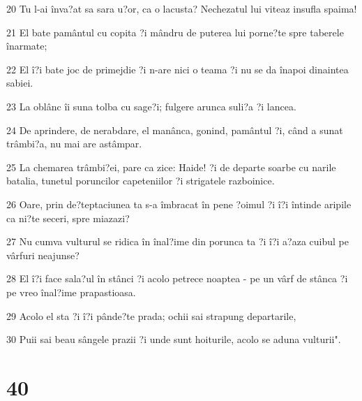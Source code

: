 \par 20 Tu l-ai înva?at sa sara u?or, ca o lacusta? Nechezatul lui viteaz insufla spaima!
\par 21 El bate pamântul cu copita ?i mândru de puterea lui porne?te spre taberele înarmate;
\par 22 El î?i bate joc de primejdie ?i n-are nici o teama ?i nu se da înapoi dinaintea sabiei.
\par 23 La oblânc îi suna tolba cu sage?i; fulgere arunca suli?a ?i lancea.
\par 24 De aprindere, de nerabdare, el manânca, gonind, pamântul ?i, când a sunat trâmbi?a, nu mai are astâmpar.
\par 25 La chemarea trâmbi?ei, pare ca zice: Haide! ?i de departe soarbe cu narile batalia, tunetul poruncilor capeteniilor ?i strigatele razboinice.
\par 26 Oare, prin de?teptaciunea ta s-a îmbracat în pene ?oimul ?i î?i întinde aripile ca ni?te seceri, spre miazazi?
\par 27 Nu cumva vulturul se ridica în înal?ime din porunca ta ?i î?i a?aza cuibul pe vârfuri neajunse?
\par 28 El î?i face sala?ul în stânci ?i acolo petrece noaptea - pe un vârf de stânca ?i pe vreo înal?ime prapastioasa.
\par 29 Acolo el sta ?i î?i pânde?te prada; ochii sai strapung departarile,
\par 30 Puii sai beau sângele prazii ?i unde sunt hoiturile, acolo se aduna vulturii".

\chapter{40}

